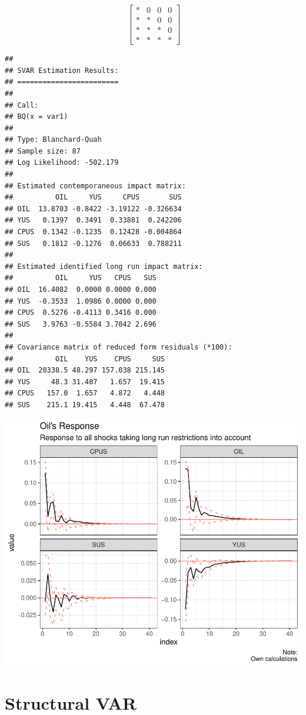 \documentclass[11pt,preprint, authoryear]{elsarticle}
\numberwithin{equation}{section}
\numberwithin{figure}{section}
\numberwithin{table}{section}
\begin{document}
\[\ \begin{bmatrix} *& 0& 0 & 0\\
*& *& 0 & 0 \\
*& *& *& 0 \\
*& *& * & * \end{bmatrix} \]

\begin{verbatim}
## 
## SVAR Estimation Results:
## ======================== 
## 
## Call:
## BQ(x = var1)
## 
## Type: Blanchard-Quah 
## Sample size: 87 
## Log Likelihood: -502.179 
## 
## Estimated contemporaneous impact matrix:
##          OIL     YUS     CPUS       SUS
## OIL  13.8703 -0.8422 -3.19122 -0.326634
## YUS   0.1397  0.3491  0.33881  0.242206
## CPUS  0.1342 -0.1235  0.12428 -0.004864
## SUS   0.1812 -0.1276  0.06633  0.788211
## 
## Estimated identified long run impact matrix:
##          OIL     YUS   CPUS   SUS
## OIL  16.4082  0.0000 0.0000 0.000
## YUS  -0.3533  1.0986 0.0000 0.000
## CPUS  0.5276 -0.4113 0.3416 0.000
## SUS   3.9763 -0.5584 3.7042 2.696
## 
## Covariance matrix of reduced form residuals (*100):
##          OIL    YUS    CPUS     SUS
## OIL  20338.5 48.297 157.038 215.145
## YUS     48.3 31.487   1.657  19.415
## CPUS   157.0  1.657   4.872   4.448
## SUS    215.1 19.415   4.448  67.478
\end{verbatim}

\includegraphics{replication_files/figure-latex/unnamed-chunk-1-1.pdf}

\hypertarget{structural-var}{%
\section{Structural VAR}\label{structural-var}}
\end{document}
